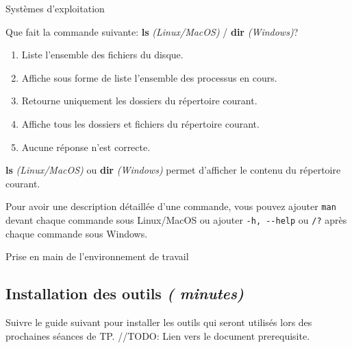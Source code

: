 \begin{section}{Systèmes d'exploitation}
    \begin{Exercice}[5 minutes]
        Que fait la commande suivante: \textbf{ls} \textit{(Linux/MacOS)} / \textbf{dir} \textit{(Windows)}?
        \begin{enumerate}
            \item Liste l'ensemble des fichiers du disque.
            \item Affiche sous forme de liste l'ensemble des processus en cours.
            \item Retourne uniquement les dossiers du répertoire courant.
            \item Affiche tous les dossiers et fichiers du répertoire courant.
            \item Aucune réponse n'est correcte.
        \end{enumerate}
        \begin{solution}
            \textbf{ls} \textit{(Linux/MacOS)} ou \textbf{dir} \textit{(Windows)} permet d'afficher le contenu du répertoire courant.
        \end{solution}
        \begin{conseil}
            Pour avoir une description détaillée d'une commande, vous pouvez ajouter \lstinline{man} devant chaque commande sous Linux/MacOS ou ajouter \lstinline{-h, --help} ou \lstinline{/?} après chaque commande sous Windows.
        \end{conseil}
    \end{Exercice}
\end{section}

\begin{section}{Prise en main de l'environnement de travail}
    \subsection{Installation des outils \textit{(\faClock {} minutes)}} 
        Suivre le guide suivant pour installer les outils qui seront utilisés lors des prochaines séances de TP. //TODO: Lien vers le document prerequisite.
\end{section}

